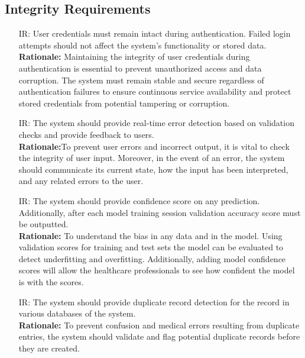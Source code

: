 \documentclass{article}
\newcounter{irnum} %
\begin{document}
\subsection{Integrity Requirements}
\begin{itemize}
    \item [IR\refstepcounter{irnum}\theirnum \label{IR_Autentication}:] User credentials must remain intact during authentication. Failed login attempts should not affect the system's functionality or stored data.\\
    \textbf{Rationale:} Maintaining the integrity of user credentials during authentication is essential to prevent unauthorized access and data corruption. The system must remain stable and secure regardless of authentication failures to ensure continuous service availability and protect stored credentials from potential tampering or corruption.

    \item [IR\refstepcounter{irnum}\theirnum \label{IR_ErrorDetection}:] The system should provide real-time error detection based on validation checks and provide feedback to users.\\
    \textbf{Rationale:}To prevent user errors and incorrect output, it is vital to check the integrity of user input. Moreover, in the event of an error, the system should communicate its current state, how the input has been interpreted, and any related errors to the user.

    \item [IR\refstepcounter{irnum}\theirnum \label{IR_ValidationScore}:] The system should provide confidence score on any prediction. Additionally, after each model training session validation accuracy score must be outputted.\\
    \textbf{Rationale:} To understand the bias in any data and in the model. Using validation scores for training and test sets the model can be evaluated to detect underfitting and overfitting. Additionally, adding model confidence scores will allow  the healthcare professionals to see how confident the model is with the scores.
    
    \item [IR\refstepcounter{irnum}\theirnum \label{IR_DuplicateRecordDetection}:] The system should provide duplicate record detection for the record in various databases of the system.\\
    \textbf{Rationale:} To prevent confusion and medical errors resulting from duplicate entries, the system should validate and flag potential duplicate records before they are created.


\end{itemize}
\end{document}
